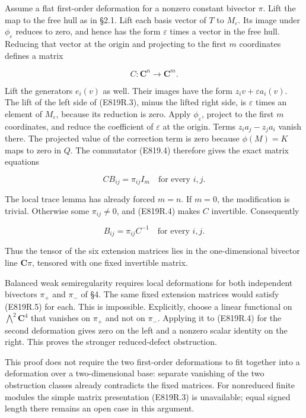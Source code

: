 Assume a flat first-order deformation for a nonzero constant bivector
\(\pi\). Lift the map to the free hull as in §2.1. Lift each basis
vector of \(T\) to \(M_\varepsilon\). Its image under
\(\phi_\varepsilon\) reduces to zero, and hence has the form
\(\varepsilon\) times a vector in the free hull. Reducing that vector at
the origin and projecting to the first \(m\) coordinates defines a
matrix

\[
 C:\mathbf C^n\longrightarrow\mathbf C^m.
\]

Lift the generators \(e_i(v)\) as well. Their images have the form
\(z_i v+\varepsilon a_i(v)\). The lift of the left side of (E819R.3),
minus the lifted right side, is \(\varepsilon\) times an element of
\(M_\varepsilon\), because its reduction is zero. Apply
\(\phi_\varepsilon\), project to the first \(m\) coordinates, and reduce
the coefficient of \(\varepsilon\) at the origin. Terms
\(z_i a_j-z_j a_i\) vanish there. The projected value of the correction
term is zero because \(\phi(M)=K\) maps to zero in \(Q\). The commutator
(E819.4) therefore gives the exact matrix equations

\[
 C B_{ij}=\pi_{ij} I_m\quad\text{for every }i,j.
 \tag{E819R.4}
\]

The local trace lemma has already forced \(m=n\). If \(m=0\), the
modification is trivial. Otherwise some \(\pi_{ij}\ne0\), and (E819R.4)
makes \(C\) invertible. Consequently

\[
 B_{ij}=\pi_{ij}C^{-1}\quad\text{for every }i,j.
 \tag{E819R.5}
\]

Thus the tensor of the six extension matrices lies in the
one-dimensional bivector line \(\mathbf C\pi\), tensored with one fixed
invertible matrix.

Balanced weak semiregularity requires local deformations for both
independent bivectors \(\pi_+\) and \(\pi_-\) of §4. The same fixed
extension matrices would satisfy (E819R.5) for each. This is impossible.
Explicitly, choose a linear functional on \(\bigwedge^2\mathbf C^4\)
that vanishes on \(\pi_+\) and not on \(\pi_-\). Applying it to
(E819R.4) for the second deformation gives zero on the left and a
nonzero scalar identity on the right. This proves the stronger
reduced-defect obstruction.

This proof does not require the two first-order deformations to fit
together into a deformation over a two-dimensional base: separate
vanishing of the two obstruction classes already contradicts the fixed
matrices. For nonreduced finite modules the simple matrix presentation
(E819R.3) is unavailable; equal signed length there remains an open case
in this argument.

